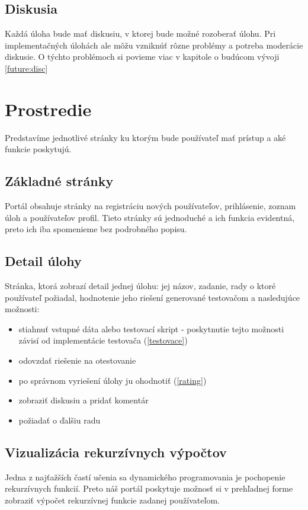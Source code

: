 \subsection{Diskusia}
Každá úloha bude mať diskusiu, v ktorej bude možné rozoberať úlohu.
Pri implementačných úlohách ale môžu vzniknúť rôzne problémy a potreba moderácie diskusie.
O týchto problémoch si povieme
viac v kapitole o budúcom vývoji \ref{future:disc}

\section{Prostredie}
Predstavíme jednotlivé stránky ku ktorým bude používateľ mať prístup a aké
funkcie poskytujú.

\subsection{Základné stránky}
Portál obsahuje stránky na registráciu nových používateľov, prihlásenie, zoznam úloh a
používateľov profil. Tieto stránky sú jednoduché a ich funkcia evidentná, preto ich iba spomenieme
bez podrobného popisu.

\subsection{Detail úlohy}
Stránka, ktorá zobrazí detail jednej úlohu: jej názov, zadanie, rady o ktoré používateľ požiadal, hodnotenie jeho riešení
generované testovačom a nasledujúce možnosti:
\begin{itemize}
  \item stiahnuť vstupné dáta alebo testovací skript - poskytnutie tejto možnosti závisí od implementácie testovača (\ref{testovace})
  \item odovzdať riešenie na otestovanie
  \item po správnom vyriešení úlohy ju ohodnotiť (\ref{rating})
  \item zobraziť diskusiu a pridať komentár
  \item požiadať o ďalšiu radu
\end{itemize}

\subsection{Vizualizácia rekurzívnych výpočtov}
Jedna z najťažších častí učenia sa dynamického programovania je pochopenie rekurzívnych funkcií.
Preto náš portál poskytuje možnosť si v prehľadnej forme zobraziť výpočet
rekurzívnej funkcie zadanej používateľom.


